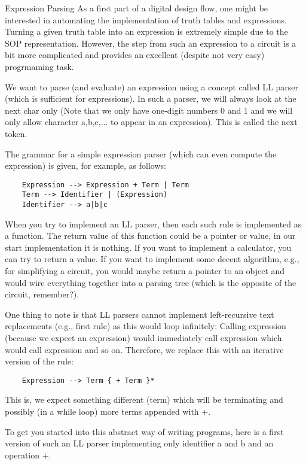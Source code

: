 \begin{task}{Expression Parsing}{}{}
  As a first part of a digital design flow, one might be interested in automating the implementation of truth tables and
  expressions. Turning a given truth table into an expression is extremely simple due to the SOP representation. However,
  the step from such an expression to a circuit is a bit more complicated and provides an excellent (despite not very easy)
  progrmaming task.

  We want to parse (and evaluate) an expression using a concept called LL parser (which is sufficient for expressions). In
  such a parser, we will always look at the next char only (Note that we only have one-digit numbers 0 and 1 and we will
  only allow character a,b,c,... to appear in an expression). This is called the next token.

  The grammar for a simple expression parser (which can even compute the expression) is given, for example, as follows:
  \begin{lstlisting}
    Expression --> Expression + Term | Term
    Term --> Identifier | (Expression)
    Identifier --> a|b|c
  \end{lstlisting}


  When you try to implement an LL parser, then each such rule is implemented as a function. The return value of this function could be a pointer or value, in our start implementation it is nothing. If you want to implement a calculator, you can try to return a value. If you want to implement some decent algorithm, e.g., for simplifying a circuit, you would maybe return a pointer to an object and would wire everything together into a parsing tree (which is the opposite of the circuit, remember?).

  One thing to note is that LL parsers cannot implement left-recursive text replacements (e.g., first rule) as this would loop infinitely: Calling expression (because we expect an expression) would immediately call expression which would call expression and so on. Therefore, we replace this with an iterative version of the rule:
  \begin{lstlisting}
    Expression --> Term { + Term }*
  \end{lstlisting}
  This is, we expect something different (term) which will be terminating and possibly (in a while loop) more terms appended with +.

  To get you started into this abstract way of writing programs, here is a first version of such an LL parser implementing only identifier a and b and an operation +.


\end{task}
